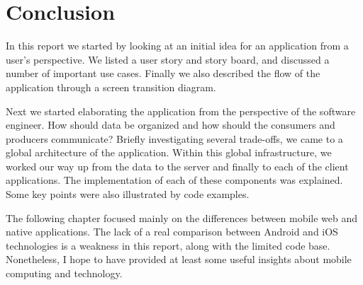 \chapter{Conclusion}\label{chapter:conclusion}

In this report we started by looking at an initial idea for an application from a user's perspective. We listed a user story and story board, and discussed a number of important use cases. Finally we also described the flow of the application through a screen transition diagram.

Next we started elaborating the application from the perspective of the software engineer. How should data be organized and how should the consumers and producers communicate? Briefly investigating several trade-offs, we came to a global architecture of the application. Within this global infrastructure, we worked our way up from the data to the server and finally to each of the client applications. The implementation of each of these components was explained. Some key points were also illustrated by code examples.

The following chapter focused mainly on the differences between mobile web and native applications. The lack of a real comparison between Android and iOS technologies is a weakness in this report, along with the limited code base. Nonetheless, I hope to have provided at least some useful insights about mobile computing and technology.

